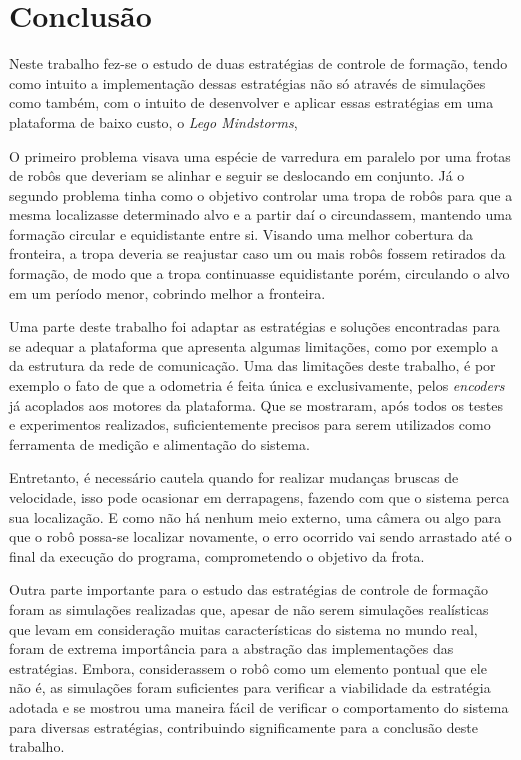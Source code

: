 \chapter{Conclusão}
\label{chap:conclusao}

Neste trabalho fez-se o estudo de duas estratégias de controle de formação, tendo como intuito a implementação dessas estratégias não só através de simulações como também, com o intuito de desenvolver e aplicar essas estratégias em uma plataforma de baixo custo, o \emph{Lego Mindstorms\textregistered},  

O primeiro problema visava uma espécie de varredura em paralelo por uma frotas de robôs que deveriam se alinhar e seguir se deslocando em conjunto. Já o segundo problema tinha como o objetivo controlar uma tropa de robôs para que a mesma localizasse determinado alvo e a partir daí o circundassem, mantendo uma formação circular e equidistante entre si. Visando uma melhor cobertura da fronteira, a tropa deveria se reajustar caso um ou mais robôs fossem retirados da formação, de modo que a tropa continuasse equidistante porém, circulando o alvo em um período menor, cobrindo melhor a fronteira.

Uma parte deste trabalho foi adaptar as estratégias e soluções encontradas para se adequar a plataforma que apresenta algumas limitações, como por exemplo a da estrutura da rede de comunicação. Uma das limitações deste trabalho, é por exemplo o fato de que a odometria é feita única e exclusivamente, pelos \emph{encoders} já acoplados aos motores da plataforma. Que se mostraram, após todos os testes e experimentos realizados, suficientemente precisos para serem utilizados como ferramenta de medição e alimentação do sistema. 

Entretanto, é necessário cautela quando for realizar mudanças bruscas de velocidade, isso pode ocasionar em derrapagens, fazendo com que o sistema perca sua localização. E como não há nenhum meio externo, uma câmera ou algo para que o robô possa-se localizar novamente, o erro ocorrido vai sendo arrastado até o final da execução do programa, comprometendo o objetivo da frota.

Outra parte importante para o estudo das estratégias de controle de formação foram as simulações realizadas que, apesar de não serem simulações realísticas que levam em consideração muitas características do sistema no mundo real, foram de extrema importância para a abstração das implementações das estratégias. Embora, considerassem o robô como um elemento pontual que ele não é, as simulações foram suficientes para verificar a viabilidade da estratégia adotada e se mostrou uma maneira fácil de verificar o comportamento do sistema para diversas estratégias, contribuindo significamente para a conclusão deste trabalho.

